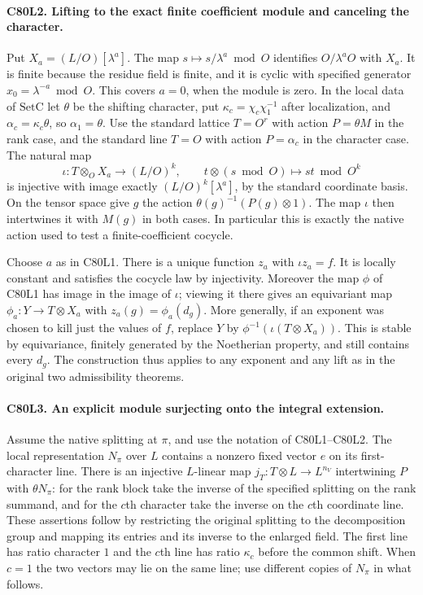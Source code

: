 \paragraph{C80L2. Lifting to the exact finite coefficient module and canceling the character.}
Put $X_a=(L/O)[\lambda^a]$. The map
$s\mapsto s/\lambda^a\bmod O$ identifies
$O/\lambda^a O$ with $X_a$. It is finite because the residue field
is finite, and it is cyclic with specified generator
$x_0=\lambda^{-a}\bmod O$. This covers $a=0$, when the module is zero.
In the local data of $\mathrm{SetC}$ let $\theta$ be the shifting
character, put $\kappa_c=\chi_c\chi_1^{-1}$ after localization,
and $\alpha_c=\kappa_c\theta$, so $\alpha_1=\theta$.
Use the standard lattice $T=O^r$ with action $P=\theta M$ in the
rank case, and the standard line $T=O$ with action
$P=\alpha_c$ in the character case. The natural map
\[
 \iota:T\otimes_O X_a\longrightarrow (L/O)^k,\qquad
 t\otimes(s\bmod O)\longmapsto st\bmod O^k
\]
is injective with image exactly $(L/O)^k[\lambda^a]$, by the
standard coordinate basis. On the tensor space give $g$ the action
$\theta(g)^{-1}(P(g)\otimes 1)$. The map $\iota$ then intertwines
it with $M(g)$ in both cases. In particular this is exactly the
native action used to test a finite-coefficient cocycle.

Choose $a$ as in C80L1. There is a unique function $z_a$ with
$\iota z_a=f$. It is locally constant and satisfies the cocycle
law by injectivity. Moreover the map $\phi$ of C80L1 has image in
the image of $\iota$; viewing it there gives an equivariant map
$\phi_a:Y\to T\otimes X_a$ with $z_a(g)=\phi_a(d_g)$.
More generally, if an exponent was chosen to kill just the values
of $f$, replace $Y$ by $\phi^{-1}(\iota(T\otimes X_a))$. This
is stable by equivariance, finitely generated by the Noetherian
property, and still contains every $d_g$. The construction thus
applies to any exponent and any lift as in the original two
admissibility theorems.

\paragraph{C80L3. An explicit module surjecting onto the integral extension.}
Assume the native splitting at $\pi$, and use the notation of
C80L1--C80L2. The local representation $N_\pi$ over $L$ contains
a nonzero fixed vector $e$ on its first-character line. There is
an injective $L$-linear map $j_T:T\otimes L\to L^{n_V}$
intertwining $P$ with $\theta N_\pi$: for the rank block take
the inverse of the specified splitting on the rank summand, and for
the $c$th character take the inverse on the $c$th coordinate line.
These assertions follow by restricting the original splitting to
the decomposition group and mapping its entries and its inverse
to the enlarged field. The first line has ratio character $1$ and the
$c$th line has ratio $\kappa_c$ before the common shift.
When $c=1$ the two vectors may lie on the same line; use different
copies of $N_\pi$ in what follows.

